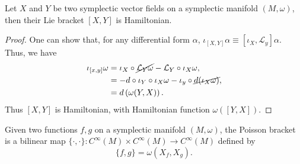 \documentclass[11pt, final]{article}
\begin{document}
\begin{prop}\label{prop:HamiltonianLieBracket}
	Let $X$ and $Y$ be two symplectic vector fields on a symplectic manifold $(M,\omega)$, then their Lie bracket $[X,Y]$ is Hamiltonian.
\end{prop}
\begin{proof}
	One can show that, for any differential form $\alpha$, $\iota_{[X,Y]} \alpha \equiv [\iota_X, \mathcal{L}_y] \alpha$. Thus, we have
		\begin{align}
			\iota_{[x,y]} \omega &= \iota_X \circ \cancel{\mathcal{L}_Y \omega} - \mathcal{L}_Y \circ \iota_X \omega, \nonumber \\
			&= - d \circ \iota_Y \circ \iota_X \omega - \iota_y \circ \cancel{ d (\iota_X \omega) }, \nonumber \\
			&= d \left( \omega(Y,X) \right).
		\end{align}
	Thus $[X,Y]$ is Hamiltonian, with Hamiltonian function $\omega([Y,X])$.
\end{proof}

\begin{definition}
	Given two functions $f,g$ on a symplectic manifold $(M,\omega)$, the Poisson bracket is a bilinear map $\{ \cdot, \cdot \} : C^\infty(M) \times C^\infty(M) \to C^\infty(M)$ defined by
		\begin{equation}
			\{ f,g \} = \omega(X_f,X_g).
		\end{equation}
\end{definition}
\end{document}
